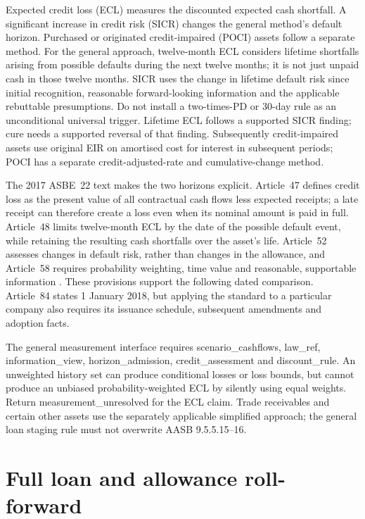 Expected credit loss (ECL) measures the discounted expected cash shortfall. A significant increase in credit risk (SICR) changes the general method's default horizon. Purchased or originated credit-impaired (POCI) assets follow a separate method. For the general approach, twelve-month ECL considers lifetime shortfalls arising from possible defaults during the next twelve months; it is not just unpaid cash in those twelve months. SICR uses the change in lifetime default risk since initial recognition, reasonable forward-looking information and the applicable rebuttable presumptions. Do not install a two-times-PD or 30-day rule as an unconditional universal trigger. Lifetime ECL follows a supported SICR finding; cure needs a supported reversal of that finding. Subsequently credit-impaired assets use original EIR on amortised cost for interest in subsequent periods; POCI has a separate credit-adjusted-rate and cumulative-change method.

The 2017 ASBE~22 text makes the two horizons explicit. Article~47 defines
credit loss as the present value of all contractual cash flows less expected
receipts; a late receipt can therefore create a loss even when its nominal
amount is paid in full. Article~48 limits twelve-month ECL by the date of the
possible default event, while retaining the resulting cash shortfalls over the
asset's life. Article~52 assesses changes in default risk, rather than changes
in the allowance, and Article~58 requires probability weighting, time value
and reasonable, supportable information \citep[Articles 47--48, 52, 58]{mofasbe22}.
These provisions support the following dated comparison. Article~84 states
1 January 2018, but applying the standard to a particular company also requires
its issuance schedule, subsequent amendments and adoption facts.

The general measurement interface requires scenario\_cashflows, law\_ref, information\_view, horizon\_admission, credit\_assessment and discount\_rule. An unweighted history set can produce conditional losses or loss bounds, but cannot produce an unbiased probability-weighted ECL by silently using equal weights. Return measurement\_unresolved for the ECL claim. Trade receivables and certain other assets use the separately applicable simplified approach; the general loan staging rule must not overwrite AASB 9.5.5.15--16.



\hypertarget{full-loan-and-allowance-roll-forward}{%
\section{Full loan and allowance roll-forward}\label{method-bank-methods-full-loan-and-allowance-roll-forward}}


